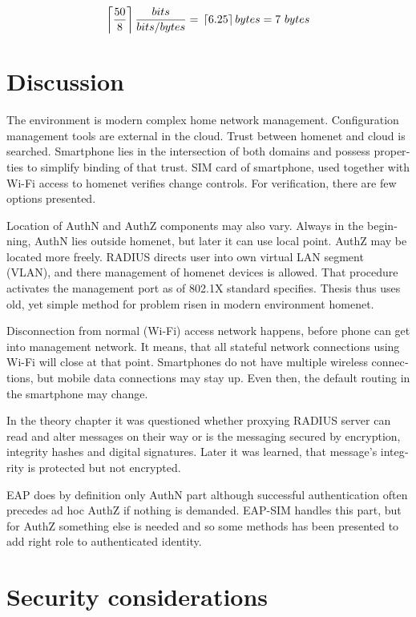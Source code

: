 \documentclass[12pt,a4paper,english]{tutthesis}
\begin{document}
\begin{otherlanguage}{english}
\begin{equation}
 \label{eq:encoding}
  \left \lceil \frac{50}8 \right \rceil \frac{bits}{bits/bytes} = \\
   \left \lceil 6.25 \right \rceil bytes = 7~{}bytes
\end{equation}

\section{Discussion}
\label{sec-6-4}

The environment is modern complex home network management.
Configuration management tools are 
external in the cloud. Trust between homenet and cloud is searched.
Smartphone lies in the intersection of both domains 
and possess properties to simplify binding of that trust.
SIM card of smartphone, used together with Wi-Fi access to homenet 
verifies change controls. For verification, there are few options presented.

Location of AuthN and AuthZ components may also vary.
Always in the beginning, AuthN lies outside homenet, but
later it can use local point. AuthZ may be located more freely.
RADIUS directs user into own virtual LAN segment (VLAN),
and there management of homenet devices is allowed.
That procedure activates the management port as of 802.1X standard
specifies.
Thesis thus uses old, yet simple method for problem risen in modern environment homenet.

Disconnection from normal (Wi-Fi) access network happens, before phone can get
into management network. It means, that all stateful network
connections using Wi-Fi will close at that point. Smartphones do not
have multiple wireless connections, but mobile data connections may 
stay up. Even then, the default routing in the smartphone may change.

In the theory chapter it was questioned whether proxying RADIUS server
can read and alter messages on their way or is the messaging secured
by encryption, integrity hashes and digital signatures.
Later it was learned, that message's integrity is protected but not encrypted.

EAP does by definition only AuthN part although successful
authentication often precedes ad hoc AuthZ if nothing is demanded.
EAP-SIM handles this part, but for AuthZ something else is needed
and so some methods has been presented to add right role to 
authenticated identity.
\section{Security considerations}
\label{sec-6-5}




\end{otherlanguage}
\end{document}
